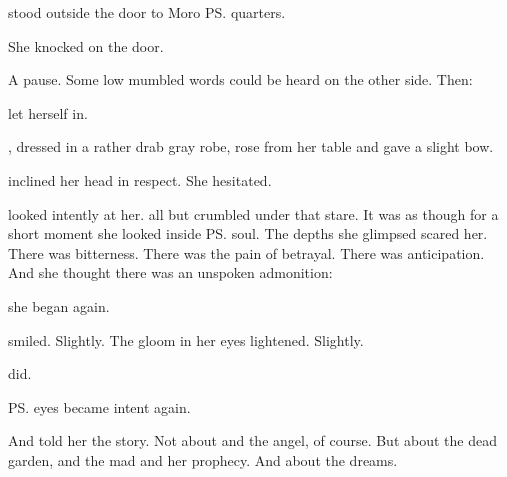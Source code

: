 \begin{comment}
\section{Tiroco and Moro}
\end{comment}
\begin{comment}
\subsection{Tiroco asks for help}
\end{comment}

\Tiroco{} stood outside the door to Moro \ps{\Cornel}{} quarters. 


She knocked on the door. 

A pause. 
Some low mumbled words could be heard on the other side. 
Then: 

\Tiroco{} let herself in. 

\Cornel{}, dressed in a rather drab gray robe, rose from her table and gave a slight bow. 

\Tiroco{} inclined her head in respect. 
She hesitated. 

\Cornel{} looked intently at her. 
\Tiroco{} all but crumbled under that stare. 
It was as though for a short moment she looked inside \ps{\Cornel}{} soul. 
The depths she glimpsed scared her. 
There was bitterness. 
There was the pain of betrayal. 
There was anticipation. 
And she thought there was an unspoken admonition: 

 she began again. 

\Cornel{} smiled. 
Slightly. 
The gloom in her eyes lightened. 
Slightly. 

\Tiroco{} did. 

\ps{\Cornel}{} eyes became intent again. 

And \Tiroco{} told her the story. 
Not about \Icor{} and the angel, of course. 
But about the dead garden, and the mad \meccaran{} and her prophecy. 
And about the dreams. 





